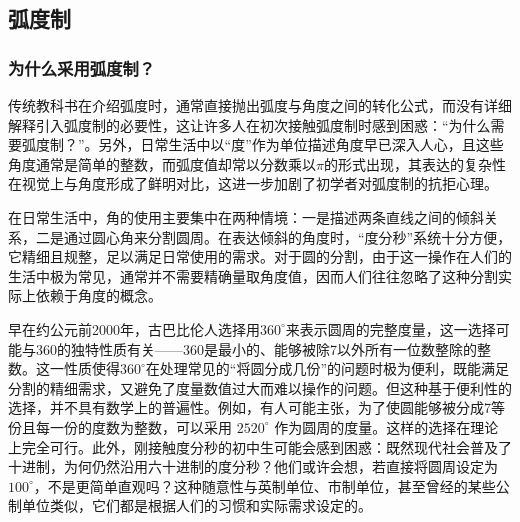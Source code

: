 
\begin{issues}
\issueDraft
\end{issues}

\subsection{弧度制}

\subsubsection{为什么采用弧度制？}

传统教科书在介绍弧度时，通常直接抛出弧度与角度之间的转化公式，而没有详细解释引入弧度制的必要性，这让许多人在初次接触弧度制时感到困惑：“为什么需要弧度制？”。另外，日常生活中以“度”作为单位描述角度早已深入人心，且这些角度通常是简单的整数，而弧度值却常以分数乘以$\pi$的形式出现，其表达的复杂性在视觉上与角度形成了鲜明对比，这进一步加剧了初学者对弧度制的抗拒心理。

在日常生活中，角的使用主要集中在两种情境：一是描述两条直线之间的倾斜关系，二是通过圆心角来分割圆周。在表达倾斜的角度时，“度分秒”系统十分方便，它精细且规整，足以满足日常使用的需求。对于圆的分割，由于这一操作在人们的生活中极为常见，通常并不需要精确量取角度值，因而人们往往忽略了这种分割实际上依赖于角度的概念。

早在约公元前2000年，古巴比伦人选择用$360^\circ$来表示圆周的完整度量，这一选择可能与360的独特性质有关——360是最小的、能够被除7以外所有一位数整除的整数。这一性质使得$360^\circ$在处理常见的“将圆分成几份”的问题时极为便利，既能满足分割的精细需求，又避免了度量数值过大而难以操作的问题。但这种基于便利性的选择，并不具有数学上的普遍性。例如，有人可能主张，为了使圆能够被分成7等份且每一份的度数为整数，可以采用 $2520^\circ$ 作为圆周的度量。这样的选择在理论上完全可行。此外，刚接触度分秒的初中生可能会感到困惑：既然现代社会普及了十进制，为何仍然沿用六十进制的度分秒？他们或许会想，若直接将圆周设定为 $100^\circ$，不是更简单直观吗？这种随意性与英制单位、市制单位，甚至曾经的某些公制单位类似，它们都是根据人们的习惯和实际需求设定的。

